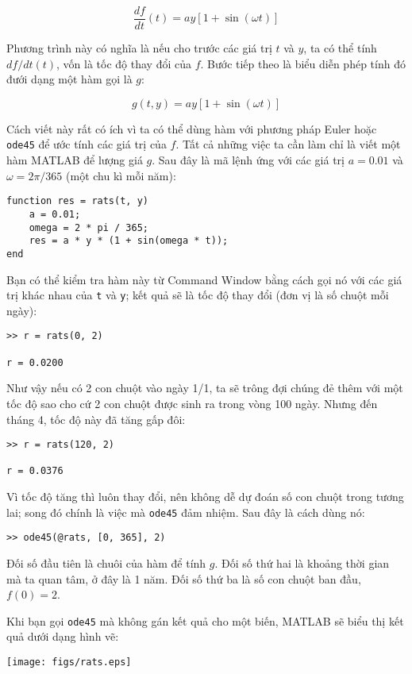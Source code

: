 \documentclass[12pt]{book}
\begin{document}
\[ \frac{df}{dt}(t) = a y \left[1 + \sin (\omega t) \right] \]

Phương trình này có nghĩa là nếu cho trước các giá trị $t$ và $y$, 
ta có thể tính $df/dt(t)$, vốn là tốc độ thay đổi của $f$. Bước
tiếp theo là biểu diễn phép tính đó đưới dạng một hàm gọi là $g$:

\[ g(t, y) = a y \left[1 + \sin (\omega t) \right] \]

Cách viết này rất có ích vì ta có thể dùng hàm với phương pháp
Euler hoặc {\tt ode45} để ước tính các giá trị của $f$. Tất cả những
việc ta cần làm chỉ là viết một hàm MATLAB để lượng giá $g$. 
Sau đây là mã lệnh ứng với các giá trị $a = 0.01$ và 
$\omega = 2 \pi/365$ (một chu kì mỗi năm):

\begin{verbatim}
function res = rats(t, y)
    a = 0.01;
    omega = 2 * pi / 365;
    res = a * y * (1 + sin(omega * t));
end
\end{verbatim}
%
Bạn có thể kiểm tra hàm này từ Command Window bằng cách 
gọi nó với các giá trị khác nhau của {\tt t} và {\tt y}; kết quả sẽ là
tốc độ thay đổi (đơn vị là số chuột mỗi ngày):

\begin{verbatim}
>> r = rats(0, 2)

r = 0.0200
\end{verbatim}
%
Như vậy nếu có 2 con chuột vào ngày 1/1, ta sẽ trông đợi chúng
đẻ thêm với một tốc độ sao cho cứ 2 con chuột được sinh ra trong
vòng 100 ngày. Nhưng đến tháng 4, tốc độ này đã tăng gấp đôi:

\begin{verbatim}
>> r = rats(120, 2)

r = 0.0376
\end{verbatim}
%
Vì tốc độ tăng thì luôn thay đổi, nên không dễ dự đoán số con 
chuột trong tương lai; song đó chính là việc mà {\tt ode45} đảm nhiệm.
Sau đây là cách dùng nó:

\begin{verbatim}
>> ode45(@rats, [0, 365], 2)
\end{verbatim}
%
Đối số đầu tiên là chuôi của hàm để tính $g$. Đối số thứ hai là khoảng
thời gian mà ta quan tâm, ở đây là 1 năm. Đối số thứ ba là số con chuột
ban đầu, $f(0) = 2$.

Khi bạn gọi {\tt ode45} mà không gán kết quả cho một biến,
MATLAB sẽ biểu thị kết quả dưới dạng hình vẽ:

\centerline{\texttt{[image: figs/rats.eps]}}
\end{document}
